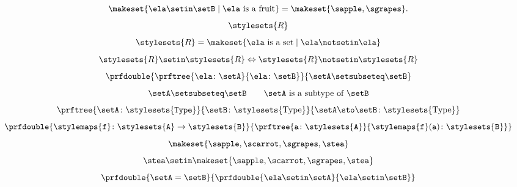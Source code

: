 \begin{forslides}
\begin{equation}
        \label{eq:stat_5_session1_22}
        \makeset{ \ela \setin\setB \mid \ela \text{ is a fruit} } = \makeset{ \sapple, \sgrapes }.
    \end{equation}
    \begin{equation}
        \label{eq:russel_session1_22}
        \stylesets{R}
    \end{equation}
    \begin{equation}
        \label{eq:russel_2_session1_22}
        \stylesets{R}=\makeset{\ela \text{ is a set}\mid \ela \notsetin \ela}
    \end{equation}
    \begin{equation}
        \label{eq:russel_3_session1_22}
        \stylesets{R} \setin \stylesets{R} \Leftrightarrow \stylesets{R} \notsetin \stylesets{R}
    \end{equation}
    \begin{equation}
        \label{eq:types_session1_22}
        \prfdouble{
            \prftree{\ela \colon \setA}{\ela \colon \setB}}{\setA \setsubseteq \setB}
    \end{equation}
    \begin{equation}
        \label{eq:types_2_session1_22}
        \setA \setsubseteq \setB \qquad \setA \text{ is a subtype of }\setB
    \end{equation}
    \begin{equation}
        \label{eq:types_3_session1_22}
        \prftree{\setA\colon \stylesets{\texttt{Type}}}{\setB\colon \stylesets{\text{Type}}}{{\setA \sto \setB \colon \stylesets{\text{Type}}}}
    \end{equation}
    \begin{equation}
        \label{eq:types_4_session1_22}
        \prfdouble{
            \stylemaps{\texttt{f}}\colon \stylesets{\texttt{A}}\to \stylesets{\texttt{B}}}{\prftree{\texttt{a}\colon \stylesets{\texttt{A}}}{\stylemaps{\texttt{f}}(\texttt{a})\colon \stylesets{\texttt{B}}}}
    \end{equation}
    \begin{equation}
        \label{eq:1_session1_22}
        \makeset{\sapple,\scarrot,\sgrapes,\stea}
    \end{equation}
    \begin{equation}
        \label{eq:2_session1_22}
        \stea \setin \makeset{\sapple,\scarrot,\sgrapes,\stea}
    \end{equation}
    \begin{equation}
        \label{eq:3_session1_22}
        \prfdouble{
            \setA =\setB}{\prfdouble{\ela \setin \setA}{\ela\setin \setB}}

\end{equation}
\end{forslides}
